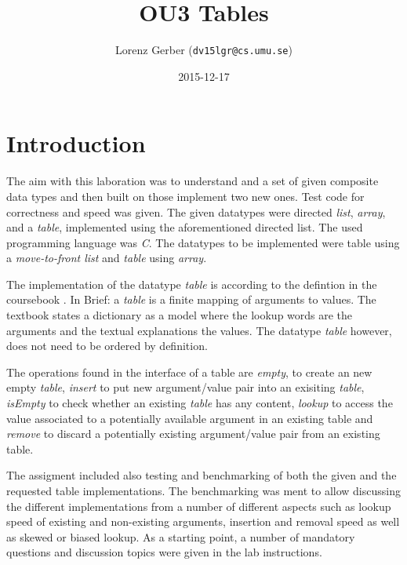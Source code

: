 \documentclass[a4paper,11pt,twoside]{article}
\title{OU3 Tables}
\author{Lorenz Gerber  ({\tt{dv15lgr@cs.umu.se}})}
\date{2015-12-17}
\begin{document}
\lstset{language=C}
\maketitle

\tableofcontents
\newpage

\section{Introduction} 
The aim with this laboration was to understand and a set of given 
composite data types and then built on those implement two new ones.
Test code for correctness and speed was given. The given datatypes
were directed \emph{list}, \emph{array}, and a \emph{table}, implemented using the 
aforementioned directed list. The used programming language was \emph{C}. 
The datatypes to be implemented were table using a \emph{move-to-front 
list} and \emph{table} using \emph{array}.

The implementation of the datatype \emph{table} is according to the 
defintion in the coursebook \cite[pp. 117 -- 132]{janlert2000}. In Brief:
a \emph{table} is a finite mapping of arguments to values. The textbook states 
a dictionary as a model where the lookup words are the arguments and the
textual explanations the values. The datatype \emph{table} however, does not 
need to be ordered by definition.

The operations found in the interface of a table are \emph{empty}, to create
an new empty \emph{table}, \emph{insert} to put new argument/value pair into an 
exisiting \emph{table}, \emph{isEmpty} to check whether an existing \emph{table} has any
content, \emph{lookup} to access the value associated to a potentially available
argument in an existing table and \emph{remove} to discard a potentially
existing argument/value pair from an existing table.  

The assigment included also testing and benchmarking of both the given and
the requested table implementations. The benchmarking was ment to
allow discussing the different implementations from a number of different
aspects such as lookup speed of existing and non-existing arguments, insertion
and removal speed as well as skewed or biased lookup. As a starting point,
a number of mandatory questions and discussion topics were given in the
lab instructions.  
\end{document}
